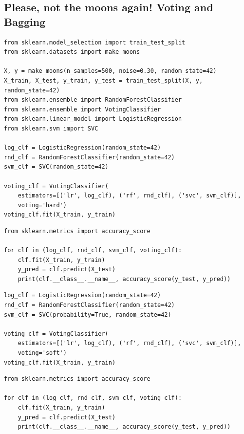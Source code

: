 \documentclass[%
oneside,                 %
final,                   %
10pt]{article}
\begin{document}
\subsection*{Please, not the moons again! Voting and Bagging}
\begin{verbatim}
from sklearn.model_selection import train_test_split
from sklearn.datasets import make_moons

X, y = make_moons(n_samples=500, noise=0.30, random_state=42)
X_train, X_test, y_train, y_test = train_test_split(X, y, random_state=42)
from sklearn.ensemble import RandomForestClassifier
from sklearn.ensemble import VotingClassifier
from sklearn.linear_model import LogisticRegression
from sklearn.svm import SVC

log_clf = LogisticRegression(random_state=42)
rnd_clf = RandomForestClassifier(random_state=42)
svm_clf = SVC(random_state=42)

voting_clf = VotingClassifier(
    estimators=[('lr', log_clf), ('rf', rnd_clf), ('svc', svm_clf)],
    voting='hard')
voting_clf.fit(X_train, y_train)
\end{verbatim}

\begin{verbatim}
from sklearn.metrics import accuracy_score

for clf in (log_clf, rnd_clf, svm_clf, voting_clf):
    clf.fit(X_train, y_train)
    y_pred = clf.predict(X_test)
    print(clf.__class__.__name__, accuracy_score(y_test, y_pred))
\end{verbatim}

\begin{verbatim}
log_clf = LogisticRegression(random_state=42)
rnd_clf = RandomForestClassifier(random_state=42)
svm_clf = SVC(probability=True, random_state=42)

voting_clf = VotingClassifier(
    estimators=[('lr', log_clf), ('rf', rnd_clf), ('svc', svm_clf)],
    voting='soft')
voting_clf.fit(X_train, y_train)
\end{verbatim}

\begin{verbatim}
from sklearn.metrics import accuracy_score

for clf in (log_clf, rnd_clf, svm_clf, voting_clf):
    clf.fit(X_train, y_train)
    y_pred = clf.predict(X_test)
    print(clf.__class__.__name__, accuracy_score(y_test, y_pred))
\end{verbatim}
\end{document}
